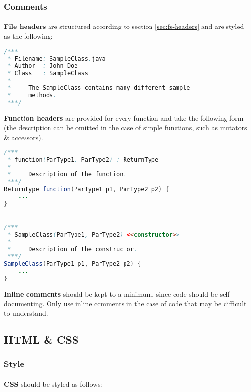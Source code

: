 \documentclass{article}
\begin{document}
    \subsubsection{Comments}
    \label{sec:ls-java-com}

    \paragraph{}
    \textbf{File headers} are structured according to section
    \ref{sec:fs-headers} and are styled as the following:

    \begin{lstlisting}[language=Java]
/***
 * Filename: SampleClass.java
 * Author  : John Doe
 * Class   : SampleClass
 *
 *     The SampleClass contains many different sample
 *     methods.
 ***/
    \end{lstlisting}

    \textbf{Function headers} are provided for every function and take the
    following form (the description can be omitted in the case of simple
    functions, such as mutators \& accessors).

    \begin{lstlisting}[language=Java]
/***
 * function(ParType1, ParType2) : ReturnType
 *
 *     Description of the function.
 ***/
ReturnType function(ParType1 p1, ParType2 p2) {
    ...
}


/***
 * SampleClass(ParType1, ParType2) <<constructor>>
 *
 *     Description of the constructor.
 ***/
SampleClass(ParType1 p1, ParType2 p2) {
    ...
}
    \end{lstlisting}

    \textbf{Inline comments} should be kept to a minimum, since code should be
    self-documenting. Only use inline comments in the case of code that may be
    difficult to understand.

    \subsection{HTML \& CSS}
    \label{sec:ls-html}

    \subsubsection{Style}
    \label{sec:ls-html-st}

    \paragraph{}
    \textbf{CSS} should be styled as follows:
\end{document}
